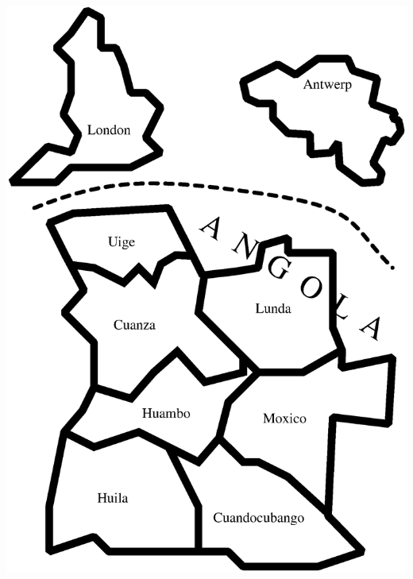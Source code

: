 \documentclass[12pt]{article}
\begin{document}
\begin{center}
\includegraphics[width=7.5in]{map_clear.eps}

\vfill

\newpage

~\vfill


\end{center}
\end{document}
